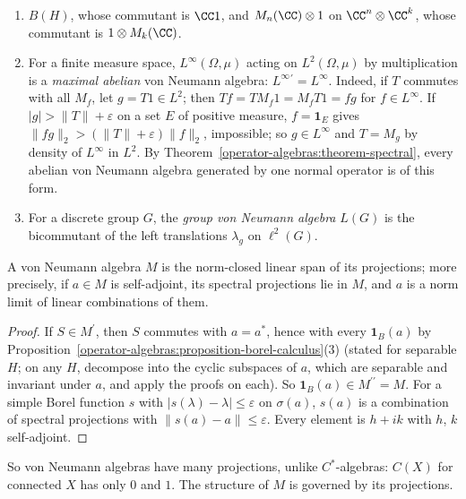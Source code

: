 \begin{example}\label{operator-algebras:example-von-neumann}
\begin{enumerate}
\item $B(H)$, whose commutant is $\CC1$, and $M_n(\CC) \otimes 1$ on $\CC^n \otimes \CC^k$, whose commutant is $1 \otimes M_k(\CC)$.
\item For a finite measure space, $L^\infty(\Omega, \mu)$ acting on $L^2(\Omega, \mu)$ by multiplication is a \emph{maximal abelian} von Neumann algebra: $L^\infty{}^{\prime} = L^\infty$. Indeed, if $T$ commutes with all $M_f$, let
$g = T1 \in L^2$; then $Tf = TM_f1 = M_fT1 = fg$ for $f \in L^\infty$. If $|g| > \|T\| + \varepsilon$ on a set $E$ of positive measure, $f = \mathbf{1}_E$ gives $\|fg\|_2 > (\|T\| + \varepsilon)\|f\|_2$, impossible; so $g \in L^\infty$
and $T = M_g$ by density of $L^\infty$ in $L^2$. By Theorem~\ref{operator-algebras:theorem-spectral}, every abelian von Neumann algebra generated by one normal operator is of this form.
\item For a discrete group $G$, the \emph{group von Neumann algebra} $L(G)$ is the bicommutant of the left translations $\lambda_g$ on $\ell^2(G)$.
\end{enumerate}
\end{example}

\begin{proposition}\label{operator-algebras:proposition-projections-generate}
A von Neumann algebra $M$ is the norm-closed linear span of its projections; more precisely, if $a \in M$ is self-adjoint, its spectral projections lie in $M$, and $a$ is a norm limit of linear combinations of them.
\end{proposition}

\begin{proof}
If $S \in M^{\prime}$, then $S$ commutes with $a = a^*$, hence with every $\mathbf{1}_B(a)$ by Proposition~\ref{operator-algebras:proposition-borel-calculus}(3) (stated for separable $H$; on any $H$, decompose into the cyclic subspaces of
$a$, which are separable and invariant under $a$, and apply the proofs on each). So $\mathbf{1}_B(a) \in M^{\prime\prime} = M$. For a simple Borel function $s$ with $|s(\lambda) - \lambda| \leq \varepsilon$ on $\sigma(a)$, $s(a)$ is a combination of spectral projections with
$\|s(a) - a\| \leq \varepsilon$. Every element is $h + ik$ with $h$, $k$ self-adjoint.
\end{proof}

So von Neumann algebras have many projections, unlike $C^*$-algebras: $C(X)$ for connected $X$ has only $0$ and $1$. The structure of $M$ is governed by its projections.

